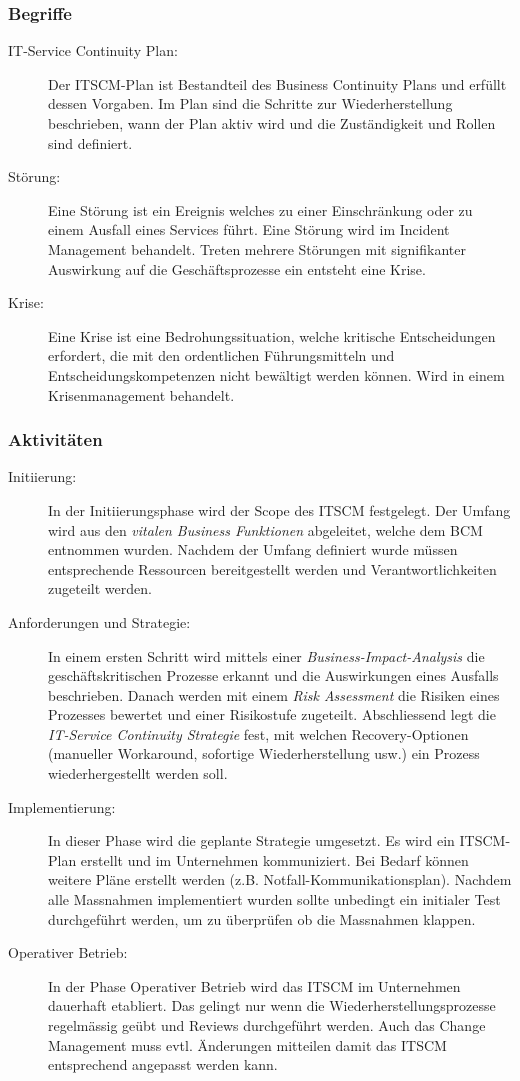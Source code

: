 \subsubsection{Begriffe}

\begin{description}
	\item[IT-Service Continuity Plan:] Der ITSCM-Plan ist Bestandteil des Business Continuity Plans und erfüllt dessen Vorgaben. Im Plan sind die Schritte zur Wiederherstellung beschrieben, wann der Plan aktiv wird und die Zuständigkeit und Rollen sind definiert.
	\item[Störung:] Eine Störung ist ein Ereignis welches zu einer Einschränkung oder zu einem Ausfall eines Services führt. Eine Störung wird im Incident Management behandelt. Treten mehrere Störungen mit signifikanter Auswirkung auf die Geschäftsprozesse ein entsteht eine Krise.
	\item[Krise:] Eine Krise ist eine Bedrohungssituation, welche kritische Entscheidungen erfordert, die mit den ordentlichen Führungsmitteln und Entscheidungskompetenzen nicht bewältigt werden können. Wird in einem Krisenmanagement behandelt.
\end{description}

\subsubsection{Aktivitäten}

\begin{description}
	\item[Initiierung:] In der Initiierungsphase wird der Scope des ITSCM festgelegt. Der Umfang wird aus den \emph{vitalen Business Funktionen} abgeleitet, welche dem BCM entnommen wurden. Nachdem der Umfang definiert wurde müssen entsprechende Ressourcen bereitgestellt werden und Verantwortlichkeiten zugeteilt werden.
	\item[Anforderungen und Strategie:] In einem ersten Schritt wird mittels einer \emph{Business-Impact-Analysis} die geschäftskritischen Prozesse erkannt und die Auswirkungen eines Ausfalls beschrieben. Danach werden mit einem \emph{Risk Assessment} die Risiken eines Prozesses bewertet und einer Risikostufe zugeteilt. Abschliessend legt die \emph{IT-Service Continuity Strategie} fest, mit welchen Recovery-Optionen (manueller Workaround, sofortige Wiederherstellung usw.) ein Prozess wiederhergestellt werden soll.
	\item[Implementierung:] In dieser Phase wird die geplante Strategie umgesetzt. Es wird ein ITSCM-Plan erstellt und im Unternehmen kommuniziert. Bei Bedarf können weitere Pläne erstellt werden (z.B. Notfall-Kommunikationsplan). Nachdem alle Massnahmen implementiert wurden sollte unbedingt ein initialer Test durchgeführt werden, um zu überprüfen ob die Massnahmen klappen.
	\item[Operativer Betrieb:] In der Phase Operativer Betrieb wird das ITSCM im Unternehmen dauerhaft etabliert. Das gelingt nur wenn die Wiederherstellungsprozesse regelmässig geübt und Reviews durchgeführt werden. Auch das Change Management muss evtl. Änderungen mitteilen damit das ITSCM entsprechend angepasst werden kann.
\end{description}

